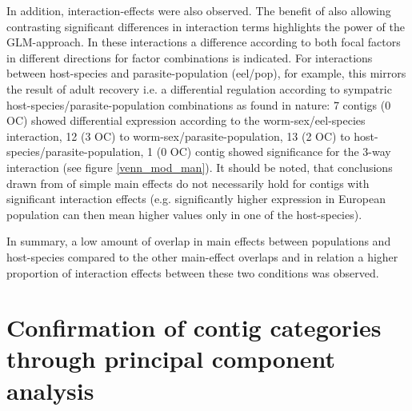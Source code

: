 In addition, interaction-effects were also observed. The benefit of
also allowing contrasting significant differences in interaction terms
highlights the power of the GLM-approach. In these interactions a
difference according to both focal factors in different directions for
factor combinations is indicated. For interactions between
host-species and parasite-population (eel/pop), for example, this
mirrors the result of adult recovery i.e. a differential regulation
according to sympatric host-species/parasite-population combinations
as found in nature: 7 contigs (0 OC) showed differential expression
according to the worm-sex/eel-species interaction, 12 (3 OC) to
worm-sex/parasite-population, 13 (2 OC) to
host-species/parasite-population, 1 (0 OC) contig showed significance
for the 3-way interaction (see figure \ref{venn_mod_man}). It should
be noted, that conclusions drawn from of simple main effects do not
necessarily hold for contigs with significant interaction effects
(e.g. significantly higher expression in European population can then
mean higher values only in one of the host-species).


\afterpage{\clearpage}

In summary, a low amount of overlap in main effects between
populations and host-species compared to the other main-effect
overlaps and in relation a higher proportion of interaction effects
between these two conditions was observed.

\section{Confirmation of contig categories through principal component
  analysis}

